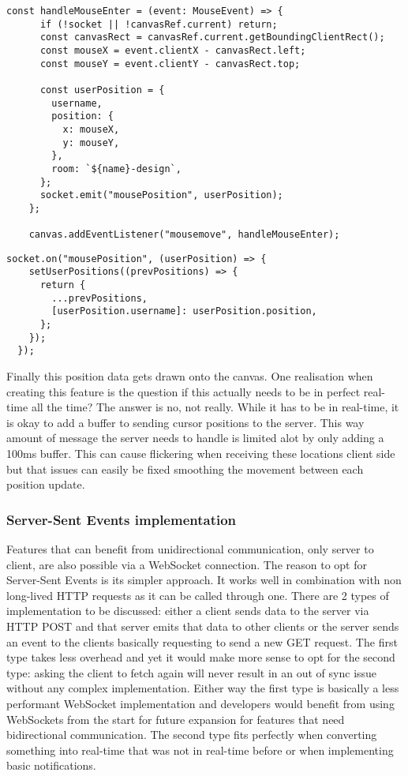 \begin{lstlisting}[caption=Client sending cursor data to server]
    const handleMouseEnter = (event: MouseEvent) => {
      if (!socket || !canvasRef.current) return;
      const canvasRect = canvasRef.current.getBoundingClientRect();
      const mouseX = event.clientX - canvasRect.left;
      const mouseY = event.clientY - canvasRect.top;
    
      const userPosition = {
        username,
        position: {
          x: mouseX,
          y: mouseY,
        },
        room: `${name}-design`,
      };
      socket.emit("mousePosition", userPosition);
    };
    
    canvas.addEventListener("mousemove", handleMouseEnter);
\end{lstlisting}

\begin{lstlisting}[caption=Client receiving other cursor data]
  socket.on("mousePosition", (userPosition) => {
    setUserPositions((prevPositions) => {
      return {
        ...prevPositions,
        [userPosition.username]: userPosition.position,
      };
    });
  });
\end{lstlisting}

Finally this position data gets drawn onto the canvas. One realisation when creating this feature is the question if this actually needs to be in perfect real-time all the time? The answer is no, not really. While it has to be in real-time, it is okay to add a buffer to sending cursor positions to the server. This way amount of message the server needs to handle is limited alot by only adding a 100ms buffer. This can cause flickering when receiving these locations client side but that issues can easily be fixed smoothing the movement between each position update. 

\subsubsection{Server-Sent Events implementation}

Features that can benefit from unidirectional communication, only server to client, are also possible via a WebSocket connection. The reason to opt for Server-Sent Events is its simpler approach. It works well in combination with non long-lived HTTP requests as it can be called through one. There are 2 types of implementation to be discussed: either a client sends data to the server via HTTP POST and that server emits that data to other clients or the server sends an event to the clients basically requesting to send a new GET request. The first type takes less overhead and yet it would make more sense to opt for the second type: asking the client to fetch again will never result in an out of sync issue without any complex implementation. Either way the first type is basically a less performant WebSocket implementation and developers would benefit from using WebSockets from the start for future expansion for features that need bidirectional communication. The second type fits perfectly when converting something into real-time that was not in real-time before or when implementing basic notifications.

